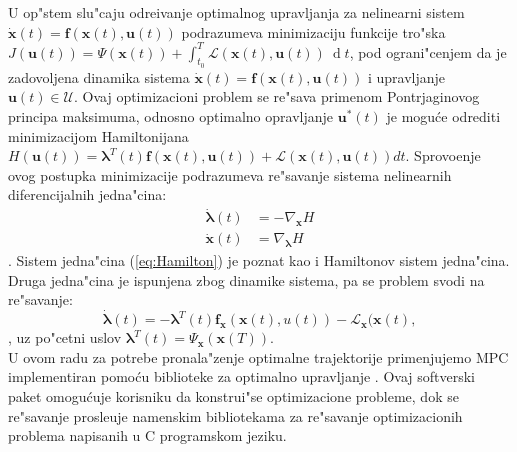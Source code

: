 \documentclass[a4paper,11pt]{article}
\theoremstyle{definition} \newtheorem{deff}{Definicija}[section]
\theoremstyle{definition} \newtheorem{prim}[deff]{Primer}
\theoremstyle{plain} \newtheorem{teor}[deff]{Teorema}
\newcommand{\vect}[1]{\boldsymbol{\mathbf{#1}}}
\begin{document}
	U op"stem slu"caju odre\dj ivanje optimalnog upravljanja za nelinearni sistem $\dot{\vect{x}}(t) = \vect{f}(\vect{x}(t), \vect{u}(t))$ podrazumeva minimizaciju funkcije tro"ska $J(\mathbf{u}(t)) = \Psi(\mathbf{x}(t)) + \int_{t_0}^{T}\mathcal{L}(\vect{x}(t), \vect{u}(t))~\operatorname{d}t$, pod ograni"cenjem da je zadovoljena dinamika sistema $\dot{\vect{x}}(t) = \vect{f}(\vect{x}(t), \vect{u}(t))$ i upravljanje $\mathbf{u}(t)\in \mathbf{\mathcal{U}}$.  Ovaj optimizacioni problem se re"sava primenom Pontrjaginovog principa maksimuma, odnosno optimalno opravljanje $\vect{u}^*(t)$ je mogu\'ce odrediti minimizacijom Hamiltonijana $H(\vect{u}(t)) = \vect{\lambda}^T(t)\vect{f}(\mathbf{x}(t), \vect{u}(t)) + \mathcal{L}(\mathbf{x}(t), \vect{u}(t))dt$. Sprovo\dj enje ovog postupka minimizacije podrazumeva re"savanje sistema nelinearnih diferencijalnih jedna"cina: 
	\begin{align}\label{eq:Hamilton}
		\dot{\vect{\lambda}}(t) &= -\nabla_{\vect{x}}H\\
		\dot{\vect{x}}(t) &= \nabla_{\vect{\lambda}}H
	\end{align}.
	Sistem jedna"cina (\ref{eq:Hamilton}) je poznat kao i Hamiltonov sistem jedna"cina. Druga jedna"cina je ispunjena zbog dinamike sistema, pa se problem svodi na re"savanje:
	\begin{equation}		\dot{\vect{\lambda}}(t) = -{\vect{\lambda}}^T(t)\vect{f}_{\mathbf{x}}(\mathbf{x}(t), u(t)) - \mathcal{L}_{\mathbf{x}}(\mathbf{x}(t),
	\end{equation}, 
	uz po"cetni uslov $\vect{\lambda}^T(t) = \Psi_{\mathbf{x}}(\mathbf{x}(T))$.\\
	
	U ovom radu za potrebe pronala"zenje optimalne trajektorije primenjujemo MPC implementiran pomo\'cu biblioteke za optimalno upravljanje \cite{CASADI}. Ovaj softverski paket omogu\'cuje korisniku da konstrui"se optimizacione probleme, dok se re"savanje prosle\dj uje namenskim bibliotekama za re"savanje optimizacionih problema napisanih u C programskom jeziku. \\
	
\end{document}
